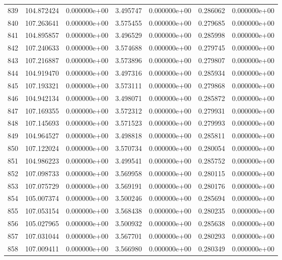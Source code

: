 \begin{tabular}{rrrrrrr}
 839 & 104.872424 &  0.000000e+00 &  3.495747 &  0.000000e+00 &   0.286062 &  0.000000e+00 \\
 840 & 107.263641 &  0.000000e+00 &  3.575455 &  0.000000e+00 &   0.279685 &  0.000000e+00 \\
 841 & 104.895857 &  0.000000e+00 &  3.496529 &  0.000000e+00 &   0.285998 &  0.000000e+00 \\
 842 & 107.240633 &  0.000000e+00 &  3.574688 &  0.000000e+00 &   0.279745 &  0.000000e+00 \\
 843 & 107.216887 &  0.000000e+00 &  3.573896 &  0.000000e+00 &   0.279807 &  0.000000e+00 \\
 844 & 104.919470 &  0.000000e+00 &  3.497316 &  0.000000e+00 &   0.285934 &  0.000000e+00 \\
 845 & 107.193321 &  0.000000e+00 &  3.573111 &  0.000000e+00 &   0.279868 &  0.000000e+00 \\
 846 & 104.942134 &  0.000000e+00 &  3.498071 &  0.000000e+00 &   0.285872 &  0.000000e+00 \\
 847 & 107.169355 &  0.000000e+00 &  3.572312 &  0.000000e+00 &   0.279931 &  0.000000e+00 \\
 848 & 107.145693 &  0.000000e+00 &  3.571523 &  0.000000e+00 &   0.279993 &  0.000000e+00 \\
 849 & 104.964527 &  0.000000e+00 &  3.498818 &  0.000000e+00 &   0.285811 &  0.000000e+00 \\
 850 & 107.122024 &  0.000000e+00 &  3.570734 &  0.000000e+00 &   0.280054 &  0.000000e+00 \\
 851 & 104.986223 &  0.000000e+00 &  3.499541 &  0.000000e+00 &   0.285752 &  0.000000e+00 \\
 852 & 107.098733 &  0.000000e+00 &  3.569958 &  0.000000e+00 &   0.280115 &  0.000000e+00 \\
 853 & 107.075729 &  0.000000e+00 &  3.569191 &  0.000000e+00 &   0.280176 &  0.000000e+00 \\
 854 & 105.007374 &  0.000000e+00 &  3.500246 &  0.000000e+00 &   0.285694 &  0.000000e+00 \\
 855 & 107.053154 &  0.000000e+00 &  3.568438 &  0.000000e+00 &   0.280235 &  0.000000e+00 \\
 856 & 105.027965 &  0.000000e+00 &  3.500932 &  0.000000e+00 &   0.285638 &  0.000000e+00 \\
 857 & 107.031044 &  0.000000e+00 &  3.567701 &  0.000000e+00 &   0.280293 &  0.000000e+00 \\
 858 & 107.009411 &  0.000000e+00 &  3.566980 &  0.000000e+00 &   0.280349 &  0.000000e+00 \\

\end{tabular}
